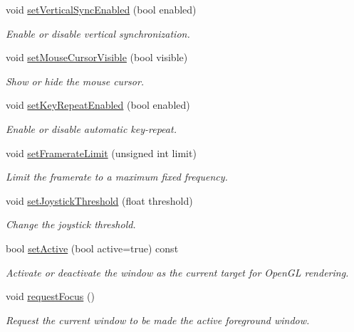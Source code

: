 \begin{DoxyCompactItemize}
void \hyperlink{classsf_1_1Window_a59041c4556e0351048f8aff366034f61}{set\+Vertical\+Sync\+Enabled} (bool enabled)
\begin{DoxyCompactList}\small\item\em Enable or disable vertical synchronization. \end{DoxyCompactList}\item 
void \hyperlink{classsf_1_1Window_aad3991c25e0a83afbb4d62febf9b7b14}{set\+Mouse\+Cursor\+Visible} (bool visible)
\begin{DoxyCompactList}\small\item\em Show or hide the mouse cursor. \end{DoxyCompactList}\item 
void \hyperlink{classsf_1_1Window_aef9f2b14c10ecba8a8df95dd51c5bb73}{set\+Key\+Repeat\+Enabled} (bool enabled)
\begin{DoxyCompactList}\small\item\em Enable or disable automatic key-\/repeat. \end{DoxyCompactList}\item 
void \hyperlink{classsf_1_1Window_af4322d315baf93405bf0d5087ad5e784}{set\+Framerate\+Limit} (unsigned int limit)
\begin{DoxyCompactList}\small\item\em Limit the framerate to a maximum fixed frequency. \end{DoxyCompactList}\item 
void \hyperlink{classsf_1_1Window_aa45b8f54e29a6f59f1fc7ee66b2fab68}{set\+Joystick\+Threshold} (float threshold)
\begin{DoxyCompactList}\small\item\em Change the joystick threshold. \end{DoxyCompactList}\item 
bool \hyperlink{classsf_1_1Window_aaab549da64cedf74fa6f1ae7a3cc79e0}{set\+Active} (bool active=true) const
\begin{DoxyCompactList}\small\item\em Activate or deactivate the window as the current target for Open\+GL rendering. \end{DoxyCompactList}\item 
void \hyperlink{classsf_1_1Window_a58cf7fa1775e8e7542032e3ecfa83b49}{request\+Focus} ()
\begin{DoxyCompactList}\small\item\em Request the current window to be made the active foreground window. \end{DoxyCompactList}\item 

\end{DoxyCompactItemize}
